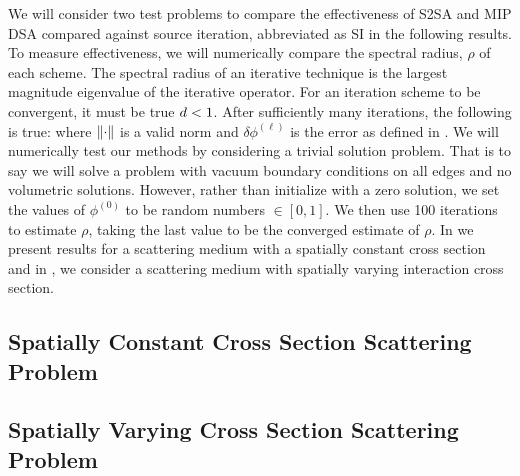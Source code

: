 We will consider two test problems to compare the effectiveness of S2SA and MIP DSA compared against source iteration, abbreviated as SI in the following results.
To measure effectiveness, we will  numerically compare the spectral radius, $\rho$ of each scheme.
The spectral radius of an iterative technique is the largest magnitude eigenvalue of the iterative operator.
For an iteration scheme to be convergent, it must be true $ d < 1$.
After sufficiently many iterations, the following is true:
\benum
{} \leq \rho {} \pec
\eenum
where $\left\lVert \cdot \right\rVert$ is a valid norm and $\delta \phi^{(\ell)}$ is the error as defined in .
We will numerically test our methods by considering a trivial solution problem.  
That is to say we will solve a problem with vacuum boundary conditions on all edges and no volumetric solutions.  
However, rather than initialize with a zero solution, we set the values of $\phi^{(0)}$ to be random numbers $\in[0,1]$.
We then use 100 iterations to estimate $\rho$, taking the last value to be the converged estimate of $\rho$.
In  we present results for a scattering medium with a spatially constant cross section and in , we consider a scattering medium with spatially varying interaction cross section.

\subsection{Spatially Constant Cross Section Scattering Problem}
\label{sec:chap4_constant_xs}


\subsection{Spatially Varying Cross Section Scattering Problem}
\label{sec:chap4_variable_xs}



